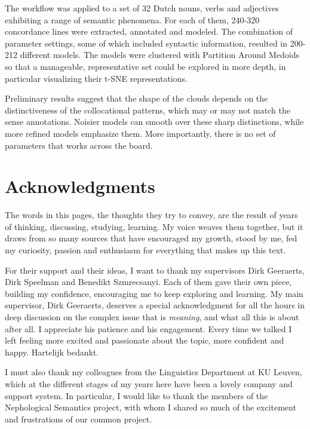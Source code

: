 \documentclass[
]{book}
\begin{document}
The workflow was applied to a set of 32 Dutch nouns, verbs and adjectives exhibiting
a range of semantic phenomena. For each of them, 240-320 concordance lines were extracted,
annotated and modeled. The combination of parameter settings, some of which included syntactic
information, resulted in 200-212 different models. The models were clustered with Partition
Around Medoids \autocite{cluster2021} so that a manageable, representative set could be explored
in more depth, in particular visualizing their t-SNE representations.

Preliminary results suggest that the shape of the clouds depends on the
distinctiveness of the collocational patterns, which may or may not match the sense
annotations. Noisier models can smooth over these sharp distinctions, while more refined
models emphasize them. More importantly, there is no set of parameters that works
across the board.

\hypertarget{acknowledgments}{%
\chapter*{Acknowledgments}\label{acknowledgments}}

The words in this pages, the thoughts they try to convey, are the result of
years of thinking, discussing, studying, learning. My voice weaves them together,
but it draws from so many sources that have encouraged my growth, stood by me,
fed my curiosity, passion and enthusiasm for everything that makes up this text.

For their support and their ideas, I want to thank my supervisors Dirk Geeraerts,
Dirk Speelman and Benedikt Szmrecsanyi. Each of them gave their own piece, building
my confidence, encouraging me to keep exploring and learning. My main supervisor,
Dirk Geeraerts, deserves a special acknowledgment for all the hours in deep
discussion on the complex issue that is \emph{meaning}, and what all this is about after
all. I appreciate his patience and his engagement. Every time we talked I left
feeling more excited and passionate about the topic, more confident and happy.
Hartelijk bedankt.

I must also thank my colleagues from the Linguistics Department at KU Leuven,
which at the different stages of my years here have been a lovely company and
support system. In particular, I would like to thank the members of the
Nephological Semantics project, with whom I shared so much of the excitement and
frustrations of our common project.
\end{document}
